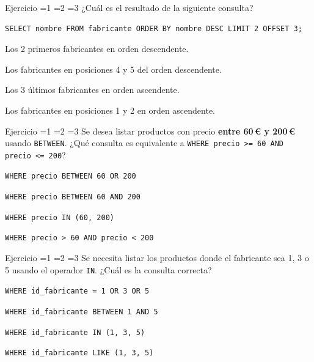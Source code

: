 \documentclass[12pt, a4paper]{article}
\newcommand{\estrella}{{\color{Goldenrod}\faStarSolid}}
\newcommand{\estrellavacia}{{\color{gray!45}\faStarSolid}}
\newcommand{\nivel}[1]{%
  \ifnum#1=1\estrella\estrellavacia\estrellavacia\fi
  \ifnum#1=2\estrella\estrella\estrellavacia\fi
  \ifnum#1=3\estrella\estrella\estrella\fi
}
\newcounter{numej}
\newcommand{\ej}{\stepcounter{numej}\thenumej}
\begin{document}
\begin{ejercicio}{Ejercicio \ej}{\nivel{1}}
¿Cuál es el resultado de la siguiente consulta?
\begin{lstlisting}
SELECT nombre FROM fabricante ORDER BY nombre DESC LIMIT 2 OFFSET 3;
\end{lstlisting}

\begin{opciones}
  \item Los 2 primeros fabricantes en orden descendente.
  \item Los fabricantes en posiciones 4 y 5 del orden descendente.
  \item Los 3 últimos fabricantes en orden ascendente.
  \item Los fabricantes en posiciones 1 y 2 en orden ascendente.
\end{opciones}
\end{ejercicio}

\begin{ejercicio}{Ejercicio \ej}{\nivel{2}}
Se desea listar productos con precio \textbf{entre 60\,€ y 200\,€}
usando \texttt{BETWEEN}. ¿Qué consulta es equivalente a
\lstinline|WHERE precio >= 60 AND precio <= 200|?

\begin{opciones}
  \item \lstinline|WHERE precio BETWEEN 60 OR 200|
  \item \lstinline|WHERE precio BETWEEN 60 AND 200|
  \item \lstinline|WHERE precio IN (60, 200)|
  \item \lstinline|WHERE precio > 60 AND precio < 200|
\end{opciones}
\end{ejercicio}

\begin{ejercicio}{Ejercicio \ej}{\nivel{2}}
Se necesita listar los productos donde el fabricante sea 1, 3 o 5
usando el operador \texttt{IN}. ¿Cuál es la consulta correcta?

\begin{opciones}
  \item \lstinline|WHERE id_fabricante = 1 OR 3 OR 5|
  \item \lstinline|WHERE id_fabricante BETWEEN 1 AND 5|
  \item \lstinline|WHERE id_fabricante IN (1, 3, 5)|
  \item \lstinline|WHERE id_fabricante LIKE (1, 3, 5)|
\end{opciones}
\end{ejercicio}
\end{document}

